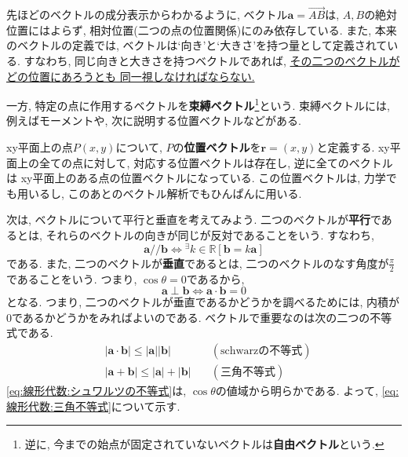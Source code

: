 \documentclass[a4j,dvipdfmx]{jsarticle}
\numberwithin{equation}{section}
\begin{document}
            先ほどのベクトルの成分表示からわかるように, ベクトル$\bm{a}=\overrightarrow{AB}$は, $A,B$の絶対位置にはよらず, 相対位置(二つの点の位置関係)にのみ依存している.
            また, 本来のベクトルの定義では, ベクトルは`向き'と`大きさ'を持つ量として定義されている. すなわち, 同じ向きと大きさを持つベクトルであれば, \underline{その二つのベクトルがどの位置にあろうとも
            同一視しなければならない.}

            一方, 特定の点に作用するベクトルを\textbf{束縛ベクトル}\footnote{逆に, 今までの始点が固定されていないベクトルは\textbf{自由ベクトル}という.}という. 束縛ベクトルには, 例えばモーメントや, 次に説明する位置ベクトルなどがある.

            xy平面上の点$P(x,y)$について, $P$の\textbf{位置ベクトル}を$\bm{r}=(x,y)$と定義する. xy平面上の全ての点に対して, 対応する位置ベクトルは存在し, 逆に全てのベクトルは
            xy平面上のある点の位置ベクトルになっている. この位置ベクトルは, 力学でも用いるし, このあとのベクトル解析でもひんぱんに用いる.

            次は, ベクトルについて平行と垂直を考えてみよう. 二つのベクトルが\textbf{平行}であるとは, それらのベクトルの向きが同じが反対であることをいう. すなわち,
            \begin{equation}
                \bm{a}/\!/\bm{b}\Leftrightarrow {}^\exists k\in\mathbb{R}\left[\bm{b}=k\bm{a}\right] \label{eq:線形代数:ベクトルの平行}
            \end{equation}
            である. また, 二つのベクトルが\textbf{垂直}であるとは, 二つのベクトルのなす角度が$\frac{\pi}{2}$であることをいう. つまり, $\cos\theta=0$であるから, 
            \begin{equation}
                \bm{a}\perp\bm{b}\Leftrightarrow \bm{a}\cdot\bm{b}=0 \label{eq:線形代数:ベクトルの垂直}
            \end{equation}
            となる. つまり, 二つのベクトルが垂直であるかどうかを調べるためには, 内積が0であるかどうかをみればよいのである.
            \clearpage
            ベクトルで重要なのは次の二つの不等式である.
            \begin{align}
                &|\bm{a}\cdot\bm{b}|\leq |\bm{a}||\bm{b}| &\quad(\text{schwarzの不等式}) \label{eq:線形代数:シュワルツの不等式}\\
                &|\bm{a}+\bm{b}| \leq |\bm{a}|+|\bm{b}| &\quad(\text{三角不等式}) \label{eq:線形代数:三角不等式}
            \end{align}
            \eqref{eq:線形代数:シュワルツの不等式}は, $\cos\theta$の値域から明らかである. よって, \eqref{eq:線形代数:三角不等式}について示す.
\end{document}
